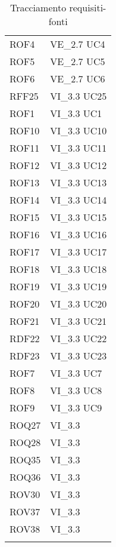 \begin{longtable}{p{2.5cm}!{\VRule[1pt]}p{2.5cm}}
	\\
	ROF4 & VE_2.7 \newline UC4
	\\
	ROF5 & VE_2.7 \newline UC5
	\\
	ROF6 & VE_2.7 \newline UC6
	\\
	RFF25 & VI_3.3 \newline UC25
	\\
	ROF1 & VI_3.3 \newline UC1
	\\
	ROF10 & VI_3.3 \newline UC10
	\\
	ROF11 & VI_3.3 \newline UC11
	\\
	ROF12 & VI_3.3 \newline UC12
	\\
	ROF13 & VI_3.3 \newline UC13
	\\
	ROF14 & VI_3.3 \newline UC14
	\\
	ROF15 & VI_3.3 \newline UC15
	\\
	ROF16 & VI_3.3 \newline UC16
	\\
	ROF17 & VI_3.3 \newline UC17
	\\
	ROF18 & VI_3.3 \newline UC18
	\\
	ROF19 & VI_3.3 \newline UC19
	\\
	ROF20 & VI_3.3 \newline UC20
	\\
	ROF21 & VI_3.3 \newline UC21
	\\
	RDF22 & VI_3.3 \newline UC22
	\\
	RDF23 & VI_3.3 \newline UC23
	\\
	ROF7 & VI_3.3 \newline UC7
	\\
	ROF8 & VI_3.3 \newline UC8
	\\
	ROF9 & VI_3.3 \newline UC9
	\\
	ROQ27 & VI_3.3 \\
	ROQ28 & VI_3.3 \\
	ROQ35 & VI_3.3 \\
	ROQ36 & VI_3.3 \\
	ROV30 & VI_3.3 \\
	ROV37 & VI_3.3 \\
	ROV38 & VI_3.3 \\
	\caption{Tracciamento requisiti-fonti}
\end{longtable}
